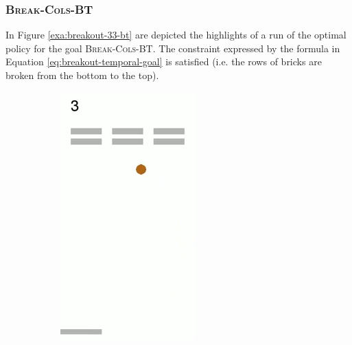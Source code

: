 \subsubsection{\textsc{Break-Cols-BT}}
In Figure \ref{exa:breakout-33-bt} are depicted the highlights of a run of the optimal policy for the goal \textsc{Break-Cols-BT}. The constraint expressed by the formula in Equation \ref{eq:breakout-temporal-goal} is satisfied (i.e. the rows of bricks are broken from the bottom to the top).


\begin{figure}[h]
	\centering
	\begin{subfigure}[b]{0.23\textwidth}
		\includegraphics[width=\textwidth]{images/breakout-33-bt-1.png}

\end{subfigure}
\end{figure}
